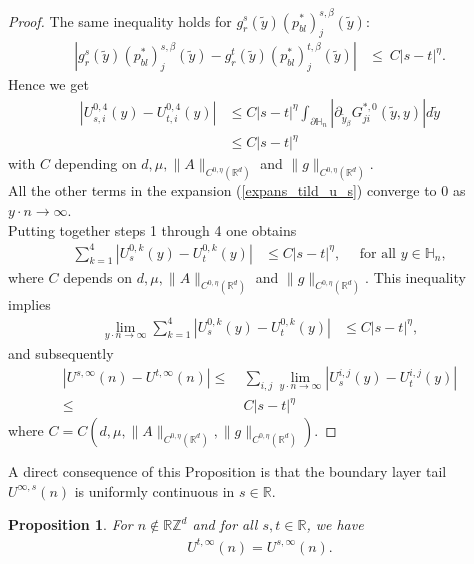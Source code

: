 \documentclass[11pt, reqno]{amsart}
\newtheorem{proposition}[theorem]{Proposition}
\theoremstyle{definition}
\theoremstyle{remark}
\numberwithin{equation}{section}
\begin{document}
\begin{proof}[Proof]
	\noindent The same inequality holds for  $ g^s_r (\tilde{y}) (p_{bl}^{*})_{j}^{s,\beta}(\tilde{y})$:
		\begin{align*}
			|g^s_r (\tilde{y}) (p_{bl}^{*})_{j}^{s,\beta}(\tilde{y})-g^t_r (\tilde{y}) (p_{bl}^{*})_{j}^{t,\beta}(\tilde{y})| 
			&\leq \: C |s-t|^\eta.
		\end{align*}  
		Hence we get 
		\begin{align*}
			|U_{s,i}^{0,4}(y)-U_{t,i}^{0,4}(y)| &\leq  C |s-t|^\eta\int_{\partial\mathbb{H}_n} | \partial_{\tilde{y}_\beta} G^{*,0}_{ji} (\tilde{y}, y)| d\tilde{y}\\
			&\leq  C |s-t|^\eta
		\end{align*}with $C$ depending on $d,\mu,\|A\|_{C^{0,\eta}(\mathbb{R}^d)}$ and $\|g\|_{C^{0,\eta}(\mathbb{R}^d)}$.\\
		
	\noindent	All the other terms in the expansion (\ref{expans_tild_u_s}) converge to $0$ as $y\cdot n \rightarrow \infty .$\\
		
		\noindent 	Putting together steps 1 through 4 one obtains
		\begin{align*}
			\sum_{k=1}^4|U_{s}^{0,k}(y)-U_{t}^{0,k}(y)| &\leq  C |s-t|^\eta, \quad \mbox{ for all } y\in \mathbb{H}_n,
		\end{align*}where $C$ depends on $d,\mu,\|A\|_{C^{0,\eta}(\mathbb{R}^d)}$ and $\|g\|_{C^{0,\eta}(\mathbb{R}^d)}$.
		This inequality implies 
		\begin{align*}
			\lim_{y\cdot n \rightarrow \infty}\sum_{k=1}^4|U_{s}^{0,k}(y)-U_{t}^{0,k}(y)| &\leq  C |s-t|^\eta, 
		\end{align*}
		and subsequently
		\begin{align*}
			| U^{s,\infty}(n) -U^{t,\infty}(n) | 
			\leq &	\:\sum_{i,j} \lim_{y\cdot n \rightarrow \infty}  |U_s^{i,j}(y) -U_t^{i,j}(y)| \\
			\leq & \: C |s-t|^\eta
		\end{align*}
		where  $C=C\left(d,\mu,\|A\|_{C^{0,\eta}(\mathbb{R}^d)},\|g\|_{C^{0,\eta}(\mathbb{R}^d)}\right).$
	\end{proof}
	\noindent A direct consequence of this Proposition is that the boundary layer tail $U^{\infty,s}(n)$ is uniformly 
	continuous in $s\in \mathbb{R}.$
	
	
	
	\begin{proposition}
		For $n\notin \mathbb{R}\mathbb{Z}^d$ and for all $s,t\in\mathbb{R}$,	we have 
		\begin{align*}
			U^{t,\infty}(n) =U^{s,\infty}(n).
		\end{align*}
		
	\end{proposition}
	
\end{document}
